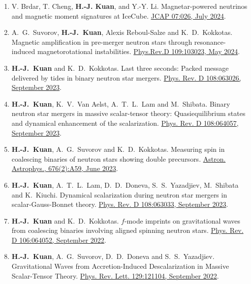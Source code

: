 \documentclass[11pt,a4paper,sans]{moderncv}
\begin{document}
\begin{enumerate}
	\item V. Brdar, T. Cheng, \textbf{H.-J. Kuan}, and Y.-Y. Li. Magnetar-powered neutrinos and magnetic moment signatures at IceCube. \href{https://iopscience.iop.org/article/10.1088/1475-7516/2024/07/026}{JCAP 07:026, July 2024}. 
	\item A.~G.~Suvorov, \textbf{H.-J.~Kuan}, Alexis Reboul-Salze and K.~D.~Kokkotas. Magnetic amplification in pre-merger neutron stars through resonance-induced magnetorotational instabilities.  \href{https://journals.aps.org/prd/abstract/10.1103/PhysRevD.109.103023}{Phys.Rev.D 109:103023, May 2024}.
	\item \textbf{H.-J.~Kuan} and K.~D.~Kokkotas. Last three seconds: Packed message delivered by tides in binary neutron star mergers. \href{https://journals.aps.org/prd/abstract/10.1103/PhysRevD.108.063026}{Phys. Rev. D 108:063026, September 2023}. 
	\item \textbf{H.-J.~Kuan}, K.~V.~Van Aelst, A.~T.~L.~Lam and M.~Shibata. Binary neutron star mergers in massive scalar-tensor theory: Quasiequilibrium states and dynamical enhancement of the scalarization. \href{https://journals.aps.org/prd/abstract/10.1103/PhysRevD.108.064057}{Phys. Rev. D 108:064057, September 2023}.
	\item \textbf{H.-J.~Kuan}, A.~G.~Suvorov and K.~D.~Kokkotas. Measuring spin in coalescing binaries of neutron stars showing double precursors. \href{	https://doi.org/10.1051/0004-6361/202346658}{Astron. Astrophys., 676(2):A59, June 2023}.
	\item \textbf{H.-J.~Kuan}, A.~T.~L.~Lam, D.~D.~Doneva, S.~S.~Yazadjiev, M.~Shibata and K.~Kiuchi. Dynamical scalarization during neutron star mergers in scalar-Gauss-Bonnet theory. \href{https://journals.aps.org/prd/abstract/10.1103/PhysRevD.108.063033}{Phys. Rev. D 108:063033, September 2023}.
	\item \textbf{H.-J.~Kuan} and K.~D.~Kokkotas. $f$-mode imprints on gravitational waves from coalescing binaries involving aligned spinning neutron stars. \href{https://journals.aps.org/prd/abstract/10.1103/PhysRevD.106.064052}{Phys. Rev. D 106:064052, September 2022}.
	\item \textbf{H.-J.~Kuan}, A.~G.~Suvorov, D.~D.~Doneva and S.~S.~Yazadjiev. Gravitational Waves from Accretion-Induced Descalarization in Massive Scalar-Tensor Theory. \href{https://journals.aps.org/prl/abstract/10.1103/PhysRevLett.129.121104}{Phys. Rev. Lett. 129:121104, September 2022}.

\end{enumerate}
\end{document}
